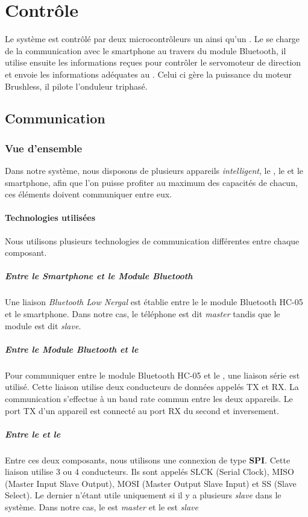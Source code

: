 	\chapter{Contrôle}
	Le système est contrôlé par deux microcontrôleurs un \pic ainsi qu'un \dspic. Le \pic se charge de la communication avec le smartphone au travers du module Bluetooth, il utilise ensuite les informations reçues pour contrôler le servomoteur de direction et envoie les informations adéquates au \dspic. Celui ci gère la puissance du moteur Brushless, il pilote l'onduleur triphasé.%
		\section{Communication}
			\subsection{Vue d'ensemble}
				Dans notre système, nous disposons de plusieurs appareils \textit{intelligent}, le \pic , le \dspic et le smartphone, afin que l'on puisse profiter au maximum des capacités de chacun, ces éléments doivent communiquer entre eux.
				\subsubsection{Technologies utilisées}
				Nous utilisons plusieurs technologies de communication différentes entre chaque composant.
				\paragraph{Entre le \textit{Smartphone} et le \textit{Module Bluetooth}} Une liaison \textit{Bluetooth Low Nergal} est établie entre le le module Bluetooth HC-05 et le smartphone. Dans notre cas, le téléphone est dit \textit{master} tandis que le module est dit \textit{slave}.
				\paragraph{Entre le \textit{Module Bluetooth} et le \textit{\pic} } Pour communiquer entre le module Bluetooth HC-05 et le \pic, une liaison série est utilisé. Cette liaison utilise deux conducteurs de données appelés TX et RX. La communication s'effectue à un baud rate commun entre les deux appareils. Le port TX d'un appareil est connecté au port RX du second et inversement.
				\paragraph{Entre le \textit{\dspic} et le \textit{\pic}} Entre ces deux composants, nous utilisons une connexion de type \textbf{SPI}. Cette liaison utilise 3 ou 4 conducteurs. Ils sont appelés SLCK (\textsf{Serial Clock}), MISO (\textsf{Master Input Slave Output}), MOSI (\textsf{Master Output Slave Input})  et SS (\textsf{Slave Select}). Le dernier n'étant utile uniquement si il y a plusieurs \textit{slave} dans le système. Dans notre cas, le \pic est \textit{master} et le \dspic est \textit{slave}
				
